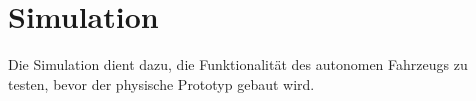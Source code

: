 \newpage
\section{Simulation}

Die Simulation dient dazu, die Funktionalität des autonomen Fahrzeugs zu testen, bevor der physische Prototyp gebaut wird.
